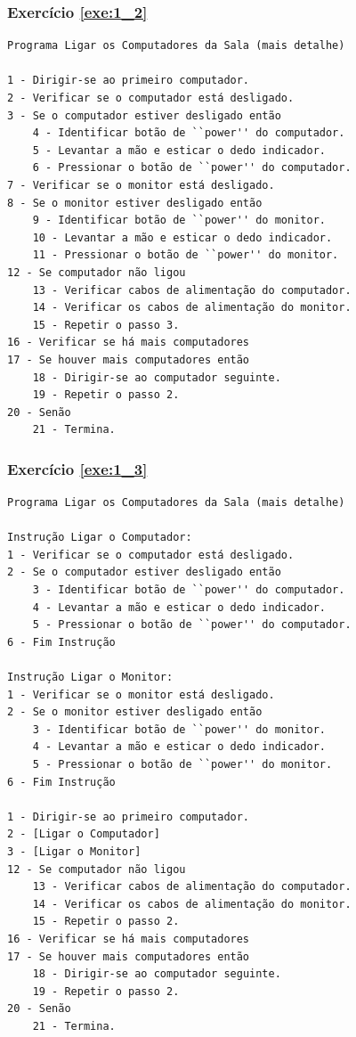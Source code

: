 \subsubsection*{Exercício \ref{exe:1_2}}
{\footnotesize
\begin{verbatim}
Programa Ligar os Computadores da Sala (mais detalhe)

1 - Dirigir-se ao primeiro computador.
2 - Verificar se o computador está desligado.
3 - Se o computador estiver desligado então
    4 - Identificar botão de ``power'' do computador.
    5 - Levantar a mão e esticar o dedo indicador.
    6 - Pressionar o botão de ``power'' do computador.
7 - Verificar se o monitor está desligado.
8 - Se o monitor estiver desligado então
    9 - Identificar botão de ``power'' do monitor.
    10 - Levantar a mão e esticar o dedo indicador.
    11 - Pressionar o botão de ``power'' do monitor.
12 - Se computador não ligou
    13 - Verificar cabos de alimentação do computador.
    14 - Verificar os cabos de alimentação do monitor.
    15 - Repetir o passo 3.
16 - Verificar se há mais computadores     
17 - Se houver mais computadores então
    18 - Dirigir-se ao computador seguinte.
    19 - Repetir o passo 2.
20 - Senão
    21 - Termina.    
\end{verbatim}}

\subsubsection*{Exercício \ref{exe:1_3}}
{\footnotesize
\begin{verbatim}
Programa Ligar os Computadores da Sala (mais detalhe)

Instrução Ligar o Computador:
1 - Verificar se o computador está desligado.
2 - Se o computador estiver desligado então
    3 - Identificar botão de ``power'' do computador.
    4 - Levantar a mão e esticar o dedo indicador.
    5 - Pressionar o botão de ``power'' do computador.
6 - Fim Instrução    

Instrução Ligar o Monitor:
1 - Verificar se o monitor está desligado.
2 - Se o monitor estiver desligado então
    3 - Identificar botão de ``power'' do monitor.
    4 - Levantar a mão e esticar o dedo indicador.
    5 - Pressionar o botão de ``power'' do monitor.
6 - Fim Instrução

1 - Dirigir-se ao primeiro computador.
2 - [Ligar o Computador]
3 - [Ligar o Monitor]
12 - Se computador não ligou
    13 - Verificar cabos de alimentação do computador.
    14 - Verificar os cabos de alimentação do monitor.
    15 - Repetir o passo 2.
16 - Verificar se há mais computadores     
17 - Se houver mais computadores então
    18 - Dirigir-se ao computador seguinte.
    19 - Repetir o passo 2.
20 - Senão
    21 - Termina.
\end{verbatim}}
